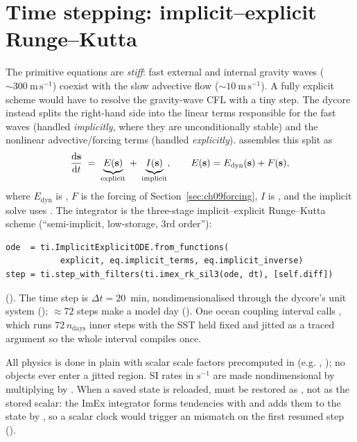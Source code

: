 \section{Time stepping: implicit--explicit Runge--Kutta}

The primitive equations are \emph{stiff}: fast external and internal gravity waves
($\sim 300\ \mathrm{m\,s^{-1}}$) coexist with the slow advective flow
($\sim 10\ \mathrm{m\,s^{-1}}$). A fully explicit scheme would have to resolve the
gravity-wave CFL with a tiny step. The dycore instead splits the right-hand side
into the linear terms responsible for the fast waves (handled \emph{implicitly},
where they are unconditionally stable) and the nonlinear advective/forcing terms
(handled \emph{explicitly}). \model{} assembles this split as
\begin{equation}
  \frac{\mathrm{d}\mathbf{s}}{\mathrm{d}t} \;=\; \underbrace{E(\mathbf{s})}_{\text{explicit}}
                      \;+\; \underbrace{I(\mathbf{s})}_{\text{implicit}},
  \qquad
  E(\mathbf{s}) = E_{\mathrm{dyn}}(\mathbf{s}) + F(\mathbf{s}),
\end{equation}
where $E_{\mathrm{dyn}}$ is , $F$ is the \model{} forcing
of Section~\ref{sec:ch09forcing}, $I$ is , and the
implicit solve uses . The integrator is the
three-stage implicit--explicit Runge--Kutta scheme 
(``semi-implicit, low-storage, 3rd order''):
\begin{lstlisting}
ode  = ti.ImplicitExplicitODE.from_functions(
           explicit, eq.implicit_terms, eq.implicit_inverse)
step = ti.step_with_filters(ti.imex_rk_sil3(ode, dt), [self.diff])
\end{lstlisting}
(). The time
step is $\Delta t = 20$~min, nondimensionalised through the dycore's unit system
(); $\approx 72$ steps make a model day
(). One ocean coupling interval calls , which runs $72\,n_{\text{days}}$ inner steps with the SST held fixed and
jitted as a traced argument so the whole interval compiles once.

\begin{remark}
All physics is done in plain \jax{} with scalar scale factors precomputed in
 (e.g. , ); no 
objects ever enter a jitted region. SI rates in $\mathrm{s^{-1}}$ are made
nondimensional by multiplying by . When a saved state is
reloaded,  must be restored as , not as the stored
scalar: the ImEx integrator forms tendencies with  and adds
them to the state by , so a scalar clock would trigger an
 mismatch on the first resumed step
().
\end{remark}

